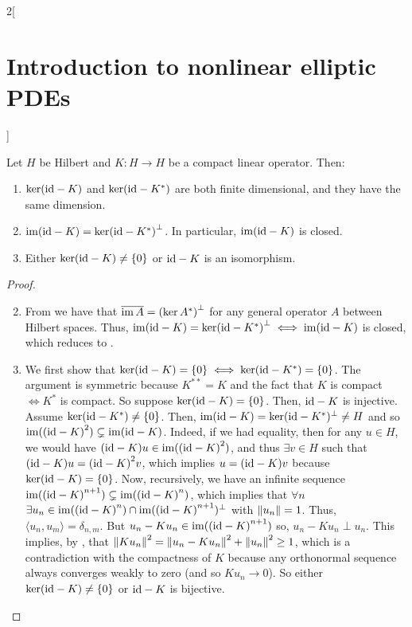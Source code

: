 \documentclass[../../../main_math.tex]{subfiles}
\begin{document}
\begin{multicols}{2}[\section{Introduction to nonlinear elliptic PDEs}]
  \begin{theorem}\label{INEPDE:fredholm}
    Let $H$ be Hilbert and $K:H\to H$ be a compact linear operator. Then:
    \begin{enumerate}
      \item $\ker(\mathrm{id}-K)$ and $\ker(\mathrm{id}-K^*)$ are both finite dimensional, and they have the same dimension.
      \item $\operatorname{im}(\mathrm{id}-K)={\ker(\mathrm{id}-K^*)}^\perp$. In particular, $\operatorname{im}(\mathrm{id}-K)$ is closed.
      \item Either $\ker(\mathrm{id}-K)\ne\{0\}$ or $\mathrm{id} -K$ is an isomorphism.
    \end{enumerate}
  \end{theorem}
  \begin{proof}
    \begin{enumerate}
      \setcounter{enumi}{1}
      \item From  we have that $\overline{\operatorname{im} A}={(\ker A^*)}^\perp$ for any general operator $A$ between Hilbert spaces. Thus, $\operatorname{im}(\mathrm{id}-K)={\ker(\mathrm{id}-K^*)}^\perp\iff \operatorname{im}(\mathrm{id}-K)$ is closed, which reduces to .
      \item We first show that $\ker(\mathrm{id}-K)=\{0\}\iff \ker(\mathrm{id}-K^*)=\{0\}$. The argument is symmetric because $K^{**}=K$ and the fact that $K$ is compact $\iff K^*$ is compact. So suppose $\ker(\mathrm{id}-K)=\{0\}$. Then, $\mathrm{id} -K$ is injective. Assume $\ker(\mathrm{id}-K^*)\ne\{0\}$. Then, $\operatorname{im} (\mathrm{id}-K)=\ker(\mathrm{id}-K^*)^\perp\ne H$ and so $\operatorname{im}({(\mathrm{id}-K)}^2)\subsetneq \operatorname{im}(\mathrm{id}-K)$. Indeed, if we had equality, then for any $u\in H$, we would have ${(\mathrm{id}-K)u}\in \operatorname{im}({(\mathrm{id}-K)}^2)$, and thus $\exists v\in H$ such that ${(\mathrm{id}-K)u}={(\mathrm{id}-K)}^2v$, which implies $u={(\mathrm{id}-K)}v$ because $\ker (\mathrm{id}-K)=\{0\}$. Now, recursively, we have an infinite sequence $\operatorname{im}({(\mathrm{id}-K)}^{n+1})\subsetneq \operatorname{im}({(\mathrm{id}-K)}^n)$, which implies that $\forall n$ $\exists u_n\in \operatorname{im}({(\mathrm{id}-K)}^n)\cap\operatorname{im}({(\mathrm{id}-K)}^{n+1})^\perp$ with $\left\|u_n\right\|=1$. Thus, $\langle u_n,u_m\rangle=\delta_{n,m}$. But $u_n-Ku_n\in \operatorname{im}({(\mathrm{id}-K)}^{n+1})$ so, $u_n-Ku_n\perp u_n$. This implies, by , that $\left\|Ku_n\right\|^2=\left\|u_n-Ku_n\right\|^2+\left\|u_n\right\|^2\geq 1$, which is a contradiction with the compactness of $K$ because any orthonormal sequence always converges weakly to zero (and so $Ku_n\to 0$). So either $\ker(\mathrm{id}-K)\ne\{0\}$ or $\mathrm{id}-K$ is bijective.


\end{enumerate}
\end{proof}
\end{multicols}
\end{document}

